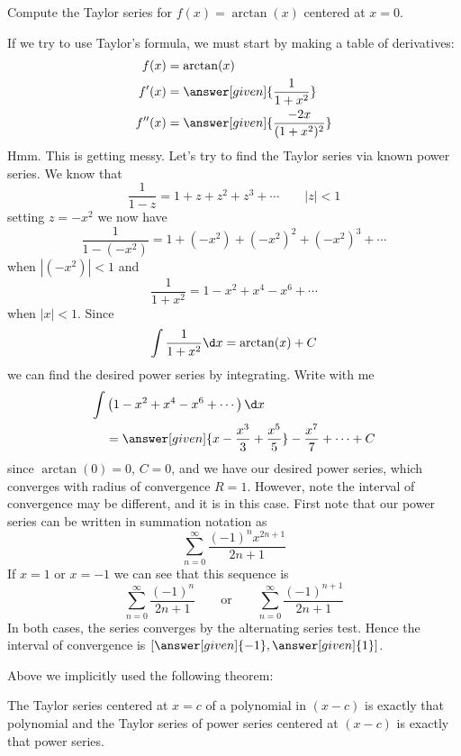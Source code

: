 \documentclass{ximera}
\begin{document}
\begin{example}
  Compute the Taylor series for $f(x) = \arctan(x)$ centered at $x=0$.
  \begin{explanation}
    If we try to use Taylor's formula, we must start by making a table
    of derivatives:
    \begin{align*}
      f(x) &= \arctan(x)\\
      f'(x) &= \answer[given]{\frac{1}{1+x^2}}\\
      f''(x) &= \answer[given]{\frac{-2x}{(1+x^2)^2}}
    \end{align*}
    Hmm. This is getting messy. Let's try to find the Taylor series
    via known power series. We know that
    \[
    \frac{1}{1-z} = 1+ z+ z^2 + z^3 + \cdots \qquad |z|< 1
    \]
    setting $z = -x^2$ we now have
    \[
    \frac{1}{1-(-x^2)} = 1 + (-x^2)+ (-x^2)^2 + (-x^2)^3 + \cdots
    \]
    when $|(-x^2)|< 1$ and
    \[
    \frac{1}{1+x^2} = 1 - x^2 + x^4 - x^6 + \cdots 
    \]
    when $|x|< 1$. Since
    \[
    \int\frac{1}{1+x^2} \d x = \arctan(x) + C
    \]
    we can find the desired power series by integrating. Write with me
    \begin{align*}
      \int &\left(1 - x^2 + x^4 - x^6 + \cdots\right)\d x \\
      &= \answer[given]{x - \frac{x^3}{3} + \frac{x^5}{5}} - \frac{x^7}{7} + \cdots +C
    \end{align*}
    since $\arctan(0) = 0$, $C=0$, and we have our desired power
    series, which converges with radius of convergence $R=1$. However,
    note the interval of convergence may be different, and it is in
    this case. First note that our power series can be written in summation notation as
    \[
    \sum_{n=0}^\infty \frac{(-1)^n x^{2n+1}}{2n+1}
    \]
    If $x=1$ or $x=-1$ we can see that this sequence is
    \[
    \sum_{n=0}^\infty \frac{(-1)^n}{2n+1}\qquad\text{or}\qquad\sum_{n=0}^\infty \frac{(-1)^{n+1}}{2n+1}
    \]
    In both cases, the series converges by the alternating series
    test. Hence the interval of convergence is $[\answer[given]{-1},\answer[given]{1}]$.
  \end{explanation}
\end{example}

Above we implicitly used the following theorem:


\begin{theorem}
  The Taylor series centered at $x=c$ of a polynomial in $(x-c)$ is
  exactly that polynomial and the Taylor series of power series
  centered at $(x-c)$ is exactly that power series.
\end{theorem}
\end{document}
